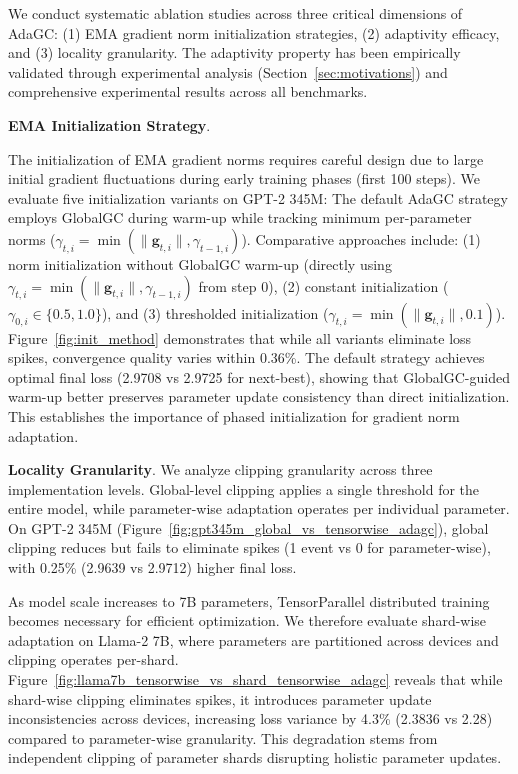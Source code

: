 We conduct systematic ablation studies across three critical dimensions of AdaGC: (1) EMA gradient norm initialization strategies, (2) adaptivity efficacy, and (3) locality granularity. The adaptivity property has been empirically validated through experimental analysis (Section~\ref{sec:motivations}) and comprehensive experimental results across all benchmarks.

\textbf{EMA Initialization Strategy}. 
 
The initialization of EMA gradient norms requires careful design due to large initial gradient fluctuations during early training phases (first 100 steps). We evaluate five initialization variants on GPT-2 345M: The default AdaGC strategy employs GlobalGC during warm-up while tracking minimum per-parameter norms ($\gamma_{t,i} = \min(\|\boldsymbol{g}_{t,i}\|, \gamma_{t-1,i})$). Comparative approaches include: (1) norm initialization without GlobalGC warm-up (directly using $\gamma_{t,i} = \min(\|\boldsymbol{g}_{t,i}\|, \gamma_{t-1,i})$ from step 0), (2) constant initialization ($\gamma_{0,i} \in \{0.5, 1.0\}$), and (3) thresholded initialization ($\gamma_{t,i} = \min(\|\boldsymbol{g}_{t,i}\|, 0.1)$). Figure~\ref{fig:init_method} demonstrates that while all variants eliminate loss spikes, convergence quality varies within 0.36\%. The default strategy achieves optimal final loss (2.9708 vs 2.9725 for next-best), showing that GlobalGC-guided warm-up better preserves parameter update consistency than direct initialization. This establishes the importance of phased initialization for gradient norm adaptation.

\textbf{Locality Granularity}. 
We analyze clipping granularity across three implementation levels. Global-level clipping applies a single threshold for the entire model, while parameter-wise adaptation operates per individual parameter. On GPT-2 345M (Figure~\ref{fig:gpt345m_global_vs_tensorwise_adagc}), global clipping reduces but fails to eliminate spikes (1 event vs 0 for parameter-wise), with 0.25\% (2.9639 vs 2.9712) higher final loss. 

As model scale increases to 7B parameters, TensorParallel distributed training becomes necessary for efficient optimization. We therefore evaluate shard-wise adaptation on Llama-2 7B, where parameters are partitioned across devices and clipping operates per-shard. Figure~\ref{fig:llama7b_tensorwise_vs_shard_tensorwise_adagc} reveals that while shard-wise clipping eliminates spikes, it introduces parameter update inconsistencies across devices, increasing loss variance by 4.3\% (2.3836 vs 2.28) compared to parameter-wise granularity. This degradation stems from independent clipping of parameter shards disrupting holistic parameter updates. 

